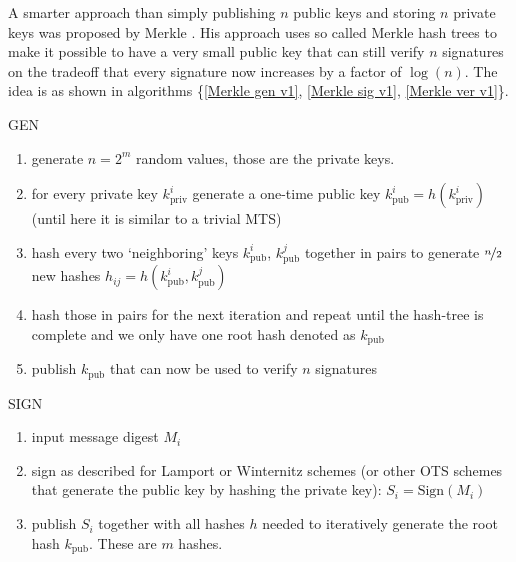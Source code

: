 \documentclass[conference]{IEEEtran}
\begin{document}
A smarter approach than simply publishing $n$ public keys and storing $n$ private keys was proposed by Merkle \cite{Merkle_ots}.
His approach uses so called Merkle hash trees to make it possible to have a very small public key that can still verify $n$ signatures on the tradeoff that every signature now increases by a factor of $\log(n)$.
The idea is as shown in algorithms \{\ref{Merkle gen v1}, \ref{Merkle sig v1}, \ref{Merkle ver v1}\}.

\begin{algorithm}
\caption{GEN}\label{Merkle gen v1}
    \begin{enumerate}
        \item generate $n=2^m$ random values, those are the private keys.
        \item for every private key $k_\text{priv}^i$ generate a one-time public key $k_\text{pub}^i=h(k_\text{priv}^i)$ (until here it is similar to a trivial MTS)
        \item hash every two `neighboring' keys $k_\text{pub}^i$, $k_\text{pub}^j$ together in pairs to generate $\nicefrac{n}{2}$ new hashes $h_{ij}=h(k_\text{pub}^i, k_\text{pub}^j)$ 
        \item hash those in pairs for the next iteration and repeat until the hash-tree is complete and we only have one root hash denoted as $k_\text{pub}$
        \item publish $k_\text{pub}$ that can now be used to verify $n$ signatures
    \end{enumerate}
\end{algorithm}

\begin{algorithm}
    \caption{SIGN}\label{Merkle sig v1}
        \begin{enumerate}
            \item input message digest $M_i$
            \item sign as described for Lamport or Winternitz schemes (or other OTS schemes that generate the public key by hashing the private key): $S_i=\text{Sign}(M_i)$
            \item publish $S_i$ together with all hashes $h$ needed to iteratively generate the root hash $k_\text{pub}$. These are $m$ hashes.
        \end{enumerate}
    \end{algorithm}
\end{document}
